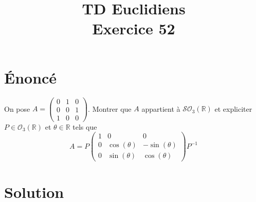 \documentclass[french]{article}
\title{TD Euclidiens\\ Exercice 52}
\date{}
\newcommand{\R}{\mathbb{R}}
\newcommand{\inv}{^{-1}}
\begin{document}
\maketitle

\section{Énoncé}
On pose $A=\displaystyle\begin{pmatrix}
	0&1&0\\
	0&0&1\\
	1&0&0
\end{pmatrix}$. Montrer que $A$ appartient à $\mathcal{SO}_3(\R)$ et expliciter $P\in\mathcal{O}_3(\R)$ et $\theta\in\R$ tels que $$A=P\begin{pmatrix}
1&0&0\\
0&\cos(\theta)&-\sin(\theta)\\
0&\sin(\theta)&\cos(\theta)
\end{pmatrix}P\inv$$
\section{Solution}
\end{document}
